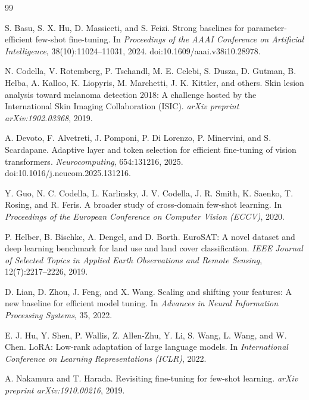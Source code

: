 \documentclass[11pt]{article}
\begin{document}
\begin{thebibliography}{99}

S. Basu, S. X. Hu, D. Massiceti, and S. Feizi.
\newblock Strong baselines for parameter-efficient few-shot fine-tuning.
\newblock In \emph{Proceedings of the AAAI Conference on Artificial Intelligence}, 38(10):11024--11031, 2024.
\newblock doi:10.1609/aaai.v38i10.28978.

N. Codella, V. Rotemberg, P. Tschandl, M. E. Celebi, S. Dusza, D. Gutman, B. Helba, A. Kalloo, K. Liopyris, M. Marchetti, J. K. Kittler, and others.
\newblock Skin lesion analysis toward melanoma detection 2018: A challenge hosted by the International Skin Imaging Collaboration (ISIC).
\newblock \emph{arXiv preprint arXiv:1902.03368}, 2019.

A. Devoto, F. Alvetreti, J. Pomponi, P. Di Lorenzo, P. Minervini, and S. Scardapane.
\newblock Adaptive layer and token selection for efficient fine-tuning of vision transformers.
\newblock \emph{Neurocomputing}, 654:131216, 2025.
\newblock doi:10.1016/j.neucom.2025.131216.

Y. Guo, N. C. Codella, L. Karlinsky, J. V. Codella, J. R. Smith, K. Saenko, T. Rosing, and R. Feris.
\newblock A broader study of cross-domain few-shot learning.
\newblock In \emph{Proceedings of the European Conference on Computer Vision (ECCV)}, 2020.

P. Helber, B. Bischke, A. Dengel, and D. Borth.
\newblock EuroSAT: A novel dataset and deep learning benchmark for land use and land cover classification.
\newblock \emph{IEEE Journal of Selected Topics in Applied Earth Observations and Remote Sensing}, 12(7):2217--2226, 2019.

D. Lian, D. Zhou, J. Feng, and X. Wang.
\newblock Scaling and shifting your features: A new baseline for efficient model tuning.
\newblock In \emph{Advances in Neural Information Processing Systems}, 35, 2022.

E. J. Hu, Y. Shen, P. Wallis, Z. Allen-Zhu, Y. Li, S. Wang, L. Wang, and W. Chen.
\newblock LoRA: Low-rank adaptation of large language models.
\newblock In \emph{International Conference on Learning Representations (ICLR)}, 2022.

A. Nakamura and T. Harada.
\newblock Revisiting fine-tuning for few-shot learning.
\newblock \emph{arXiv preprint arXiv:1910.00216}, 2019.


\end{thebibliography}
\end{document}
